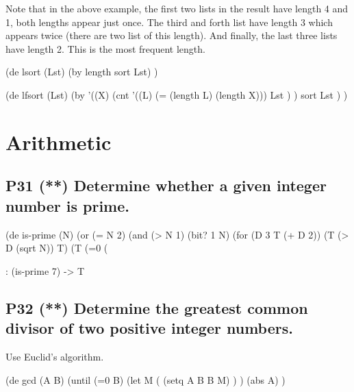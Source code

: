 Note that in the above example, the first two lists in the result have
length 4 and 1, both lengths appear just once. The third and forth list
have length 3 which appears twice (there are two list of this length).
And finally, the last three lists have length 2. This is the most
frequent length.

\begin{wideverbatim}

(de lsort (Lst)
   (by length sort Lst) )

(de lfsort (Lst)
   (by
      '((X)
         (cnt
            '((L) (= (length L) (length X)))
            Lst ) )
      sort Lst ) )

\end{wideverbatim}


\pagebreak{}
\section*{Arithmetic}

\subsection*{{P31} (**) Determine whether a given
integer number is prime.}
\label{sec:99-problems-P31}

\begin{wideverbatim}

(de is-prime (N)
   (or
      (= N 2)
      (and
         (> N 1)
         (bit? 1 N)
         (for (D 3  T  (+ D 2))
            (T (> D (sqrt N)) T)
            (T (=0 (%

\end{wideverbatim}

\begin{wideverbatim}
   : (is-prime 7)
   -> T
\end{wideverbatim}

\subsection*{{P32} (**) Determine the greatest common
divisor of two positive integer numbers.}
\label{sec:99-problems-P32}

Use Euclid's algorithm.

\begin{wideverbatim}

(de gcd (A B)
   (until (=0 B)
      (let M (%
         (setq A B B M) ) )
   (abs A) )

\end{wideverbatim}

